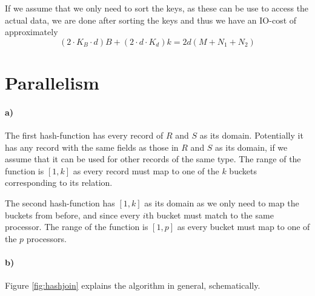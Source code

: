\documentclass[a4paper, 11pt]{article}
\begin{document}
If we assume that we only need to sort the keys, as these can be use to access the actual data, we are done after sorting the keys and thus we have an IO-cost of approximately
\[
    (2 \cdot K_B \cdot d) B + (2 \cdot d \cdot K_d) k =
    2 d (M + N_1 + N_2)
\]





\section{Parallelism} %
\label{sec:parallelism}

\paragraph{a)} %

The first hash-function has every record of $R$ and $S$ as its domain. Potentially it has any record with the same fields as those in $R$ and $S$ as its domain, if we assume that it can be used for other records of the same type. The range of the function is $[1, k]$ as every record must map to one of the $k$ buckets corresponding to its relation.

The second hash-function has $[1, k]$ as its domain as we only need to map the buckets from before, and since every $i$th bucket must match to the same processor. The range of the function is $[1, p]$ as every bucket must map to one of the $p$ processors.

\paragraph{b)} %

Figure \ref{fig:hashjoin} explains the algorithm in general, schematically.
\end{document}
